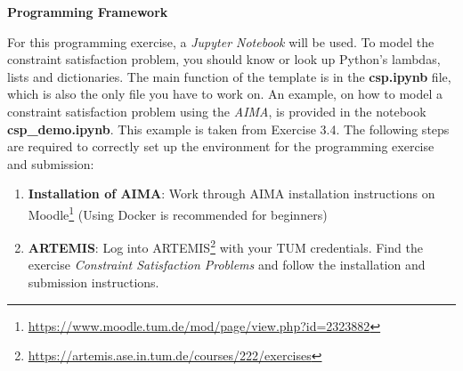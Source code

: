 \documentclass[a4paper,10pt]{article}
\begin{document}
\noindent \textbf{Programming Framework}

\normalsize
For this programming exercise, a \textit{Jupyter Notebook} will be used. To model the constraint satisfaction problem, you should know or look up Python's lambdas, lists and dictionaries. The main function of the template is in the \textbf{csp.ipynb} file, which is also the only file you have to work on. An example, on how to model a constraint satisfaction problem using the \textit{AIMA}, is provided in the notebook \textbf{csp\_demo.ipynb}. This example is taken from Exercise 3.4. 
The following steps are required to correctly set up the environment for the programming exercise and submission:

\begin{enumerate}
	\item \textbf{Installation of AIMA}: Work through AIMA installation instructions on Moodle\footnote{\href{https://www.moodle.tum.de/mod/page/view.php?id=2323882}{https://www.moodle.tum.de/mod/page/view.php?id=2323882}} (Using Docker is recommended for beginners)
	\item \textbf{ARTEMIS}: Log into ARTEMIS\footnote{\href{https://artemis.ase.in.tum.de/courses/222/exercises}{https://artemis.ase.in.tum.de/courses/222/exercises}} with your TUM credentials. Find the exercise \textit{Constraint Satisfaction Problems} and follow the installation and submission instructions.
\end{enumerate}
\end{document}
